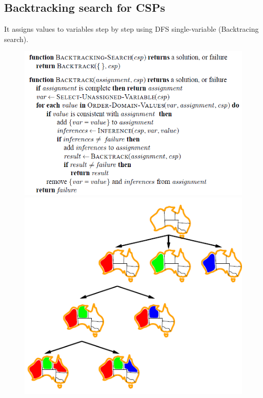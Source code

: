 \documentclass{article}
\begin{document}
\subsection{Backtracking search for CSPs}
It assigns values to variables step by step using DFS single-variable (Backtracing search).\\
\begin{figure}[h!]
\includegraphics[scale=0.6]{24.png}
\includegraphics[scale=0.6]{25.png}
\end{figure}
\end{document}
